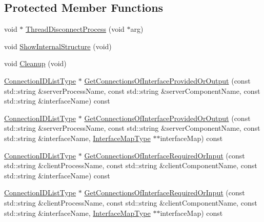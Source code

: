 \subsection*{Protected Member Functions}
\begin{DoxyCompactItemize}
\item 
void $\ast$ \hyperlink{classmts_manager_global_a0f668467bf640bdae65ec86dea9d01b8}{Thread\+Disconnect\+Process} (void $\ast$arg)
\item 
void \hyperlink{classmts_manager_global_af027272981d69071395d21a3e0634418}{Show\+Internal\+Structure} (void)
\item 
void \hyperlink{classmts_manager_global_a2f527606d2fe5b67bbe7d7323f562e20}{Cleanup} (void)
\item 
\hyperlink{classmts_manager_global_a01bcfffc97f320cdd87425bd4bd5bbad}{Connection\+I\+D\+List\+Type} $\ast$ \hyperlink{classmts_manager_global_a2ddfed4e74f4dd60bd7994825604b2dd}{Get\+Connections\+Of\+Interface\+Provided\+Or\+Output} (const std\+::string \&server\+Process\+Name, const std\+::string \&server\+Component\+Name, const std\+::string \&interface\+Name) const 
\item 
\hyperlink{classmts_manager_global_a01bcfffc97f320cdd87425bd4bd5bbad}{Connection\+I\+D\+List\+Type} $\ast$ \hyperlink{classmts_manager_global_acdcea160cd8e70e14c692442b4b16849}{Get\+Connections\+Of\+Interface\+Provided\+Or\+Output} (const std\+::string \&server\+Process\+Name, const std\+::string \&server\+Component\+Name, const std\+::string \&interface\+Name, \hyperlink{structmts_manager_global_1_1_interface_map_type}{Interface\+Map\+Type} $\ast$$\ast$interface\+Map) const 
\item 
\hyperlink{classmts_manager_global_a01bcfffc97f320cdd87425bd4bd5bbad}{Connection\+I\+D\+List\+Type} $\ast$ \hyperlink{classmts_manager_global_a5d4b54accc2a9c1e98440966690ef85f}{Get\+Connections\+Of\+Interface\+Required\+Or\+Input} (const std\+::string \&client\+Process\+Name, const std\+::string \&client\+Component\+Name, const std\+::string \&interface\+Name) const 
\item 
\hyperlink{classmts_manager_global_a01bcfffc97f320cdd87425bd4bd5bbad}{Connection\+I\+D\+List\+Type} $\ast$ \hyperlink{classmts_manager_global_a1e0b2e1ca58062ee8993cccd0ade1cb9}{Get\+Connections\+Of\+Interface\+Required\+Or\+Input} (const std\+::string \&client\+Process\+Name, const std\+::string \&client\+Component\+Name, const std\+::string \&interface\+Name, \hyperlink{structmts_manager_global_1_1_interface_map_type}{Interface\+Map\+Type} $\ast$$\ast$interface\+Map) const 

\end{DoxyCompactItemize}
